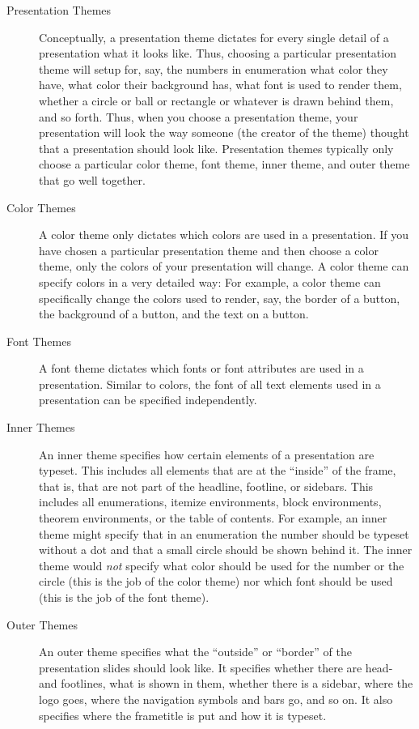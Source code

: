 \begin{description}
\item[Presentation Themes]
  Conceptually, a presentation theme dictates for every single detail of a presentation what it looks like. Thus, choosing a particular presentation theme will setup for, say, the numbers in enumeration what color they have, what color their background has, what font is used to render them, whether a circle or ball or rectangle or whatever is drawn behind them, and so forth. Thus, when you choose a presentation theme, your presentation will look the way someone (the creator of the theme) thought that a presentation should look like. Presentation themes typically only choose a particular color theme, font theme, inner theme, and outer theme that go well together.
\item[Color Themes]
  A color theme only dictates which colors are used in a presentation. If you have chosen a particular presentation theme and then choose a color theme, only the colors of your presentation will change. A color theme can specify colors in a very detailed way: For example, a color theme can specifically change the colors used to render, say, the border of a button, the background of a button, and the text on a button.
\item[Font Themes]
  A font theme dictates which fonts or font attributes are used in a presentation. Similar to colors, the font of all text elements used in a presentation can be specified independently.
\item[Inner Themes]
  An inner theme specifies how certain elements of a presentation are typeset. This includes all elements that are at the ``inside'' of the frame, that is, that are not part of the headline, footline, or sidebars. This includes all enumerations, itemize environments, block environments, theorem environments, or the table of contents. For example, an inner theme might specify that in an enumeration the number should be typeset without a dot and that a small circle should be shown behind it. The inner theme would \emph{not} specify what color should be used for the number or the circle (this is the job of the color theme) nor which font should be used (this is the job of the font theme).
\item[Outer Themes]
  An outer theme specifies what the ``outside'' or ``border'' of the presentation slides should look like. It specifies whether there are head- and footlines, what is shown in them, whether there is a sidebar, where the logo goes, where the navigation symbols and bars go, and so on. It also specifies where the frametitle is put and how it is typeset.
\end{description}

